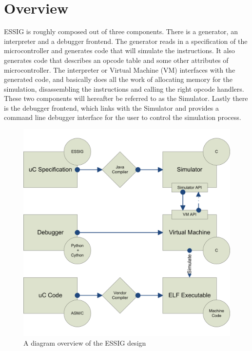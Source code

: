 \chapter{Overview}
\ac{ESSIG} is roughly composed out of three components. There is a generator,
an interpreter and a debugger frontend. The generator reads in a specification
of the microcontroller %
and generates code that will simulate the instructions. It also generates code
that describes an opcode table and some other attributes of microcontroller.
The interpreter or Virtual Machine (VM) interfaces with the generated code, and
basically does all the work of allocating memory for the simulation,
disassembling the instructions and calling the right opcode handlers. These two
components will hereafter be referred to as the Simulator. Lastly there is the
debugger frontend, which links with the Simulator and provides a command line
debugger interface for the user to control the simulation process.

\begin{figure}
\begin{center}
\includegraphics[width=\textwidth]{diagrams/tombstones.png}
\end{center}
\caption{A diagram overview of the \ac{ESSIG} design}
\end{figure}

